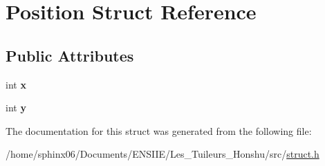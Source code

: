 \hypertarget{structPosition}{}\section{Position Struct Reference}
\label{structPosition}
\subsection*{Public Attributes}
\begin{DoxyCompactItemize}
\item 
\mbox{\label{structPosition_aeda152ffeee17ae5be9c02327b2408d8}} 
int {\bfseries x}
\item 
\mbox{\label{structPosition_a3c08e9213d4726b21caba3073192c4a3}} 
int {\bfseries y}
\end{DoxyCompactItemize}


The documentation for this struct was generated from the following file\+:\begin{DoxyCompactItemize}
\item 
/home/sphinx06/\+Documents/\+E\+N\+S\+I\+I\+E/\+Les\+\_\+\+Tuileurs\+\_\+\+Honshu/src/\hyperlink{struct_8h}{struct.\+h}\end{DoxyCompactItemize}
